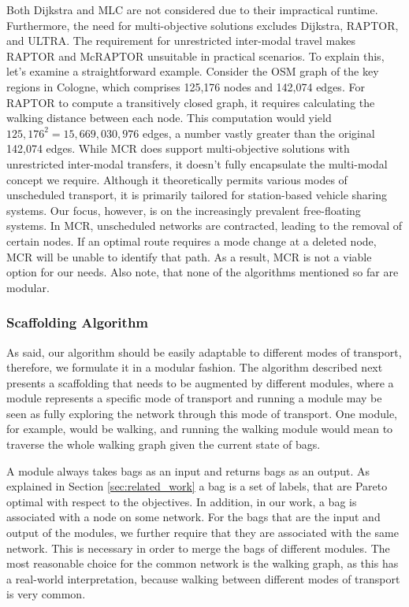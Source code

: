 Both Dijkstra and MLC are not considered due to their impractical runtime.
Furthermore, the need for multi-objective solutions excludes Dijkstra, RAPTOR, and ULTRA.
The requirement for unrestricted inter-modal travel makes RAPTOR and McRAPTOR unsuitable in practical scenarios.
To explain this, let's examine a straightforward example.
Consider the OSM graph of the key regions in Cologne, which comprises 125,176 nodes and 142,074 edges.
For RAPTOR to compute a transitively closed graph, it requires calculating the walking distance between each node.
This computation would yield \(125,176^2 = 15,669,030,976\) edges, a number vastly greater than the original 142,074 edges.
While MCR does support multi-objective solutions with unrestricted inter-modal transfers, it doesn't fully encapsulate the multi-modal concept we require.
Although it theoretically permits various modes of unscheduled transport, it is primarily tailored for station-based vehicle sharing systems.
Our focus, however, is on the increasingly prevalent free-floating systems.
In MCR, unscheduled networks are contracted, leading to the removal of certain nodes.
If an optimal route requires a mode change at a deleted node, MCR will be unable to identify that path.
As a result, MCR is not a viable option for our needs.
Also note, that none of the algorithms mentioned so far are modular.

\subsubsection{Scaffolding Algorithm}
\label{subsubsec:algorithm}

As said, our algorithm should be easily adaptable to different modes of transport, therefore, we formulate it in a modular fashion.
The algorithm described next presents a scaffolding that needs to be augmented by different modules, where a module represents a specific mode of transport and running a module may be seen as fully exploring the network through this mode of transport.
One module, for example, would be walking, and running the walking module would mean to traverse the whole walking graph given the current state of bags.

A module always takes bags as an input and returns bags as an output.
As explained in Section \ref{sec:related_work} a bag is a set of labels, that are Pareto optimal with respect to the objectives.
In addition, in our work, a bag is associated with a node on some network.
For the bags that are the input and output of the modules, we further require that they are associated with the same network.
This is necessary in order to merge the bags of different modules.
The most reasonable choice for the common network is the walking graph, as this has a real-world interpretation, because walking between different modes of transport is very common.

